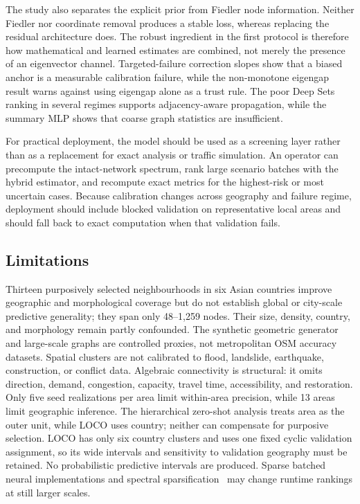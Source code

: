 \documentclass[11pt]{article}
\begin{document}
The study also separates the explicit prior from Fiedler node information.
Neither Fiedler nor coordinate removal produces a stable loss, whereas replacing
the residual architecture does. The robust ingredient in the first protocol is
therefore how mathematical and learned estimates are combined, not merely the
presence of an eigenvector channel. Targeted-failure correction slopes show
that a biased anchor is a measurable calibration failure, while the
non-monotone eigengap result warns against using eigengap alone as a trust
rule. The poor Deep Sets ranking in several
regimes supports adjacency-aware propagation, while the summary MLP shows that
coarse graph statistics are insufficient.

For practical deployment, the model should be used as a screening layer rather
than as a replacement for exact analysis or traffic simulation. An operator can
precompute the intact-network spectrum, rank large scenario batches with the
hybrid estimator, and recompute exact metrics for the highest-risk or most
uncertain cases. Because calibration changes across geography and failure
regime, deployment should include blocked validation on representative local
areas and should fall back to exact computation when that validation fails.

\subsection{Limitations}
Thirteen purposively selected neighbourhoods in six Asian countries improve
geographic and morphological coverage but do not establish global or
city-scale predictive generality; they span only 48--1,259 nodes. Their size,
density, country, and morphology remain partly confounded. The
synthetic geometric generator and large-scale graphs are controlled proxies,
not metropolitan OSM accuracy datasets. Spatial clusters are not calibrated to flood,
landslide, earthquake, construction, or conflict data. Algebraic connectivity
is structural: it omits direction, demand, congestion, capacity, travel time,
accessibility, and restoration. Only five seed realizations per area limit
within-area precision, while 13 areas limit geographic inference. The
hierarchical zero-shot analysis treats area as the outer unit, while LOCO uses
country; neither can compensate for purposive selection. LOCO has only six
country clusters and uses one fixed cyclic validation assignment, so its wide
intervals and sensitivity to validation geography must be retained. No
probabilistic predictive intervals are
produced. Sparse batched neural
implementations and spectral sparsification~\cite{spielman2011} may change
runtime rankings at still larger scales.
\end{document}
